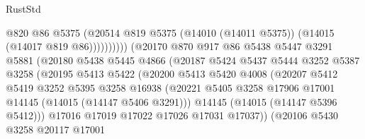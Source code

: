 \begin{lexlean}{RustStd}
\begin{coremodule}
                                        @820
                                        @86
                                        @5375
                                        (@20514
                                          @819
                                          @5375
                                          (@14010 (@14011 @5375))
                                          (@14015 (@14017 @819 @86))))))))))
                          (@20170
                            @870
                            @917
                            @86
                            @5438
                            @5447
                            @3291
                            @5881
                            (@20180
                              @5438
                              @5445
                              @4866
                              (@20187
                                @5424
                                @5437
                                @5444
                                @3252
                                @5387
                                @3258
                                (@20195
                                  @5413
                                  @5422
                                  (@20200
                                    @5413
                                    @5420
                                    @4008
                                    (@20207
                                      @5412
                                      @5419
                                      @3252
                                      @5395
                                      @3258
                                      @16938
                                      (@20221
                                        @5405
                                        @3258
                                        @17906
                                        @17001
                                        @14145
                                        (@14015 (@14147 @5406 @3291)))
                                      @14145
                                      (@14015 (@14147 @5396 @5412)))
                                    @17016
                                    @17019
                                    @17022
                                    @17026
                                    @17031
                                    @17037))
                                (@20106
                                  @5430
                                  @3258
                                  @20117
                                  @17001

\end{coremodule}
\end{lexlean}
